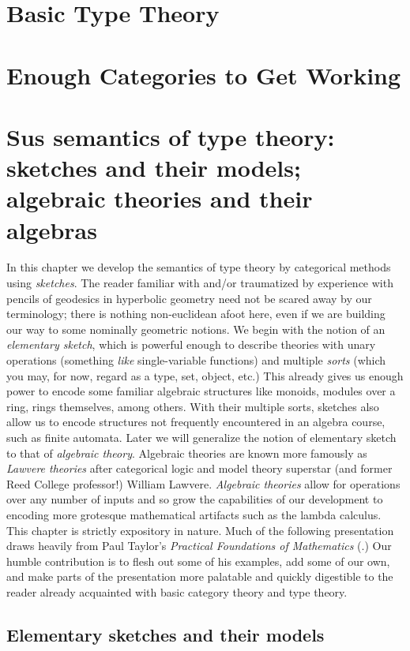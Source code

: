 \documentclass[12pt,twoside]{reedthesis}
\theoremstyle{definition}
\theoremstyle{remark}
\theoremstyle{theorem}
\begin{document}
\chapter{Basic Type Theory}
\chapter{Enough Categories to Get Working}
\chapter{Sus semantics of type theory: sketches and their models; algebraic theories and their algebras}
In this chapter we develop the semantics of type theory by categorical methods
using \emph{sketches}. The reader familiar with and/or traumatized by experience
with pencils of geodesics in hyperbolic geometry need not be scared away by our
terminology; there is nothing non-euclidean afoot here, even if we are building
our way to some nominally geometric notions. We begin with the notion of an
\emph{elementary sketch}, which is powerful enough to describe theories with
unary operations (something \emph{like} single-variable functions) and multiple
\emph{sorts} (which you may, for now, regard as a type, set, object, etc.) This
already gives us enough power to encode some familiar algebraic structures like
monoids, modules over a ring, rings themselves, among others. With their
multiple sorts, sketches also allow us to encode structures not frequently
encountered in an algebra course, such as finite automata. Later we will
generalize the notion of elementary sketch to that of \emph{algebraic theory}.
Algebraic theories are known more famously as \emph{Lawvere theories} after
categorical logic and model theory superstar (and former Reed College
professor!) William Lawvere. \emph{Algebraic theories} allow for operations over
any number of inputs and so grow the capabilities of our development to encoding
more grotesque mathematical artifacts such as the lambda calculus. This chapter
is strictly expository in nature. Much of the following presentation draws
heavily from Paul Taylor's \emph{Practical Foundations of Mathematics}
(\cite{taylor_practical_1999}.) Our humble contribution is to flesh out some of
his examples, add some of our own, and make parts of the presentation more
palatable and quickly digestible to the reader already acquainted with basic
category theory and type theory.

\section{Elementary sketches and their models}
\end{document}
